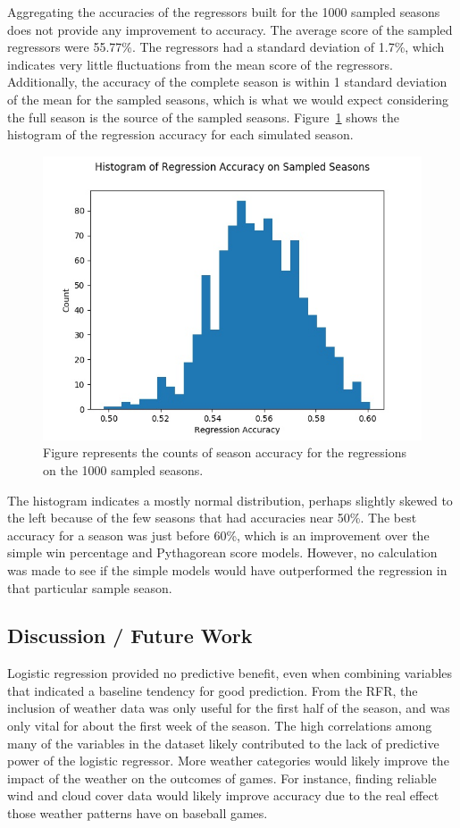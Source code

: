 \documentclass{article}
\begin{document}
Aggregating the accuracies of the regressors built for the 1000 sampled seasons
does not provide any improvement to accuracy.
The average score of the sampled regressors were 55.77\%.
The regressors had a standard deviation of 1.7\%,
which indicates very little fluctuations from the mean score of the regressors.
Additionally,
the accuracy of the complete season is within 1 standard deviation of the mean
for the sampled seasons,
which is what we would expect considering the full season is the source of the
sampled seasons.
Figure~\ref{Fig:SampResults} shows the histogram of the regression accuracy for
each simulated season.
\begin{figure}[ht]
    \centering
    \includegraphics[width=.8\textwidth]{hist_acc.jpg}
    \caption{Figure \label{Fig:SampResults} represents the counts of season
    accuracy for the regressions on the 1000 sampled seasons.}
\end{figure}
The histogram indicates a mostly normal distribution,
perhaps slightly skewed to the left because of the few seasons that had 
accuracies near 50\%.
The best accuracy for a season was just before 60\%,
which is an improvement over the simple win percentage and Pythagorean score
models.
However,
no calculation was made to see if the simple models would have outperformed 
the regression in that particular sample season.

\subsection{Discussion / Future Work}
Logistic regression provided no predictive benefit,
even when combining variables that indicated a baseline tendency for good
prediction.
From the RFR,
the inclusion of weather data was only useful for the first half of the season,
and was only vital for about the first week of the season.
The high correlations among many of the variables in the dataset likely
contributed to the lack of predictive power of the logistic regressor.
More weather categories would likely improve the impact of the weather on the
outcomes of games.
For instance,
finding reliable wind and cloud cover data would likely improve accuracy due
to the real effect those weather patterns have on baseball games. \par
\end{document}
